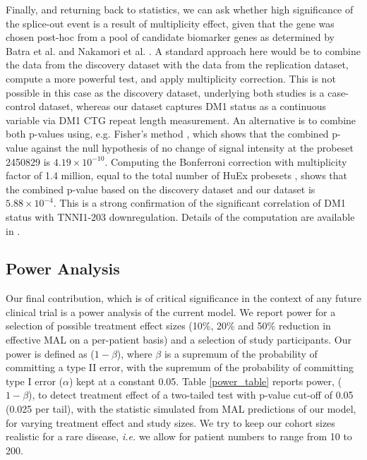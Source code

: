 \documentclass[10pt,letterpaper]{article}
\begin{document}
Finally, and returning back to statistics, we can ask whether high significance of the splice-out event is a result of multiplicity effect, given that the gene was chosen post-hoc from a pool of candidate biomarker genes as determined by Batra et al. and Nakamori et al. \cite{Batra2014, Nakamori2013}. A standard approach here would be to combine the data from the discovery dataset with the data from the replication dataset, compute a more powerful test, and apply multiplicity correction. This is not possible in this case as the discovery dataset, underlying both studies is a case-control dataset, whereas our dataset captures DM1 status as a continuous variable via DM1 CTG repeat length measurement. An alternative is to combine both p-values using, e.g. Fisher's method \cite{Fisher1934}, which shows that the combined p-value against the null hypothesis of no change of signal intensity at the probeset 2450829 is $4.19\times 10^{-10}$. Computing the Bonferroni correction with multiplicity factor of 1.4 million, equal to the total number of HuEx probesets \cite{Affymetrix2005}, shows that the combined p-value based on the discovery dataset and our dataset is $5.88 \times 10^{-4}$. This is a strong confirmation of the significant correlation of DM1 status with TNNI1-203 downregulation. Details of the computation are available in .

\subsection*{Power Analysis}

\label{poweranalysis}

Our final contribution, which is of critical significance in the context of any future clinical trial is a power analysis of the current model. We report power for a selection of possible treatment effect sizes (10\%, 20\% and 50\% reduction in effective MAL on a per-patient basis) and a selection of study participants. Our power is defined as ($1 - \beta$), where $\beta$ is a supremum of the probability of committing a type II error, with the supremum of the probability of committing type I error ($\alpha$) kept at a constant 0.05. Table \ref{power_table} reports power, ($1 - \beta$), to detect treatment effect of a two-tailed test with p-value cut-off of 0.05 (0.025 per tail), with the statistic simulated from MAL predictions of our model, for varying treatment effect and study sizes. We try to keep our cohort sizes realistic for a rare disease, {\it i.e.} we allow for patient numbers to range from 10 to 200.
\end{document}
